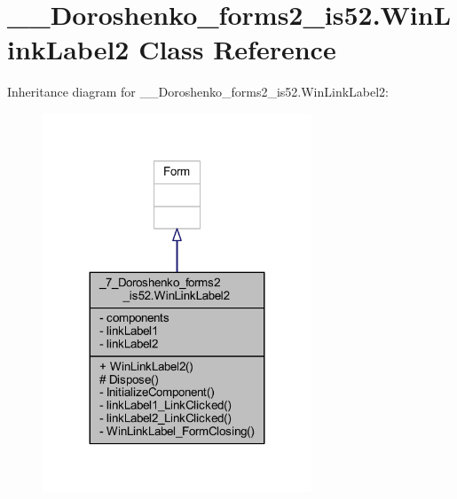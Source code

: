 \hypertarget{class__7___doroshenko__forms2__is52_1_1_win_link_label2}{}\section{\+\_\+\_\+\+Doroshenko\+\_\+forms2\+\_\+is52.\+Win\+Link\+Label2 Class Reference}
\label{class__7___doroshenko__forms2__is52_1_1_win_link_label2}


Inheritance diagram for \+\_\+\_\+\+Doroshenko\+\_\+forms2\+\_\+is52.\+Win\+Link\+Label2\+:
\nopagebreak
\begin{figure}[H]
\begin{center}
\leavevmode
\includegraphics[width=227pt]{class__7___doroshenko__forms2__is52_1_1_win_link_label2__inherit__graph}
\end{center}
\end{figure}


